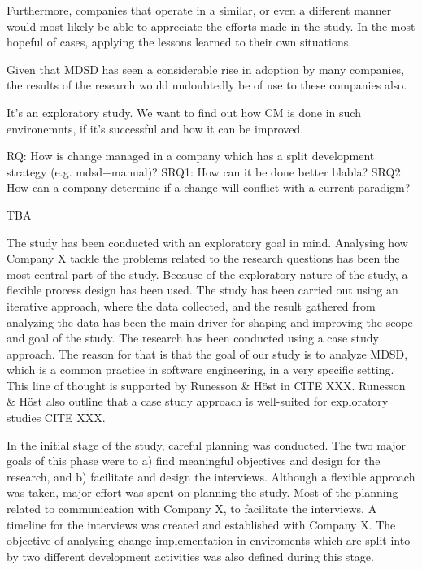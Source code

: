 \documentclass[times, 10pt,twocolumn]{IEEEtran}
\begin{document}
Furthermore, companies that operate in a similar, or even a different manner would most likely be able to appreciate the efforts made in the study. In the most hopeful of cases, applying the lessons learned to their own situations.

Given that MDSD has seen a considerable rise in adoption by many companies\cite{millermda}, the results of the research would undoubtedly be of use to these companies also.

It's an exploratory study. We want to find out how CM is done in such environemnts, if it's successful and how it can be improved. 

RQ: How is change managed in a company which has a split development strategy (e.g. mdsd+manual)?
SRQ1: How can it be done better blabla?
SRQ2: How can a company determine if a change will conflict with a current paradigm?

TBA
\newpage



The study has been conducted with an exploratory goal in mind. Analysing how Company X tackle the problems related to the research questions has been the most central part of the study. Because of the exploratory nature of the study, a flexible process design has been used. The study has been carried out using an iterative approach, where the data collected, and the result gathered from analyzing the data has been the main driver for shaping and improving the scope and goal of the study. The research has been conducted using a case study approach. The reason for that is that the goal of our study is to analyze MDSD, which is a common practice in software engineering, in a very specific setting. This line of thought is supported by Runesson \& Höst in CITE XXX. Runesson \& Höst also outline that a case study approach is well-suited for exploratory studies CITE XXX. 

In the initial stage of the study, careful planning was conducted. The two major goals of this phase were to a) find meaningful objectives and design for the research, and b) facilitate and design the interviews. Although a flexible approach was taken, major effort was spent on planning the study. Most of the planning related to communication with Company X, to facilitate the interviews. A timeline for the interviews was created and established with Company X. The objective of analysing change implementation in enviroments which are split into by two different development activities was also defined during this stage. 
\end{document}
